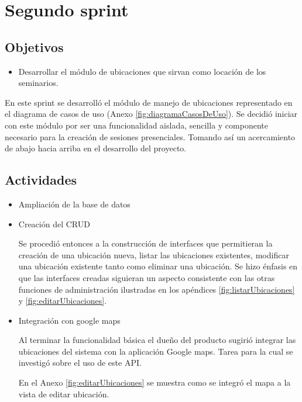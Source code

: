 \section{Segundo sprint} %
\label{sec:segundo_sprint}

\subsection{Objetivos}

\begin{itemize}
	\item Desarrollar el módulo de ubicaciones que sirvan como locación de los seminarios.
\end{itemize}

En este sprint se desarrolló el módulo de manejo de ubicaciones representado en el diagrama de casos de uso (Anexo \ref{fig:diagramaCasosDeUso}). Se decidió iniciar con este módulo por ser una funcionalidad aislada, sencilla y componente necesario para la creación de sesiones presenciales. Tomando así un acercamiento de abajo hacia arriba en el desarrollo del proyecto.

\subsection{Actividades} %
\label{sub:actividades2}

\begin{itemize}

\item Ampliación de la base de datos

\item Creación del \gls{CRUD}


Se procedió entonces a la construcción de interfaces que permitieran la creación de una ubicación nueva, listar las ubicaciones existentes, modificar una ubicación existente tanto como eliminar una ubicación. Se hizo énfasis en que las interfaces creadas siguieran un aspecto consistente con las otras funciones de administración ilustradas en los apéndices \ref{fig:listarUbicaciones} y \ref{fig:editarUbicaciones}.

\item Integración con google maps

Al terminar la funcionalidad básica el dueño del producto sugirió integrar las ubicaciones del sistema con la aplicación Google maps. Tarea para la cual se investigó sobre el uso de este \gls{API}. 

En el Anexo \ref{fig:editarUbicaciones} se muestra como se integró el mapa a la vista de editar ubicación.

\end{itemize}





